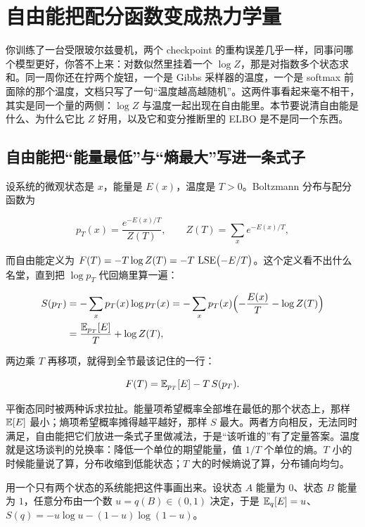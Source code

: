 \section{自由能把配分函数变成热力学量}
\label{sec:13-Machine-Learning/13-Statistical-Physics-and-Free-Energy/01}

你训练了一台受限玻尔兹曼机，两个 checkpoint 的重构误差几乎一样，同事问哪个模型更好，你答不上来：对数似然里挂着一个 \(\log Z\)，那是对指数多个状态求和。同一周你还在拧两个旋钮，一个是 Gibbs 采样器的温度，一个是 softmax 前面除的那个温度，文档只写了一句``温度越高越随机''。这两件事看起来毫不相干，其实是同一个量的两侧：\(\log Z\) 与温度一起出现在自由能里。本节要说清自由能是什么、为什么它比 \(Z\) 好用，以及它和变分推断里的 ELBO 是不是同一个东西。

\subsection{自由能把``能量最低''与``熵最大''写进一条式子}

设系统的微观状态是 \(x\)，能量是 \(E(x)\)，温度是 \(T>0\)。Boltzmann 分布与配分函数为

\[
p_T(x)=\frac{e^{-E(x)/T}}{Z(T)},
\qquad
Z(T)=\sum_x e^{-E(x)/T},
\]

而自由能定义为 \(F(T)=-T\log Z(T)=-T\,\operatorname{LSE}\bigl(-E/T\bigr)\)。这个定义看不出什么名堂，直到把 \(\log p_T\) 代回熵里算一遍：

\[
\begin{aligned}
S(p_T)&=-\sum_x p_T(x)\log p_T(x)
=-\sum_x p_T(x)\Bigl(-\frac{E(x)}{T}-\log Z(T)\Bigr)\\
&=\frac{\mathbb{E}_{p_T}[E]}{T}+\log Z(T),
\end{aligned}
\]

两边乘 \(T\) 再移项，就得到全节最该记住的一行：

\[
F(T)=\mathbb{E}_{p_T}[E]-T\,S(p_T).
\]

平衡态同时被两种诉求拉扯。能量项希望概率全部堆在最低的那个状态上，那样 \(\mathbb{E}[E]\) 最小；熵项希望概率摊得越平越好，那样 \(S\) 最大。两者方向相反，无法同时满足，自由能把它们放进一条式子里做减法，于是``该听谁的''有了定量答案。温度就是这场谈判的兑换率：降低一个单位的期望能量，值 \(1/T\) 个单位的熵。\(T\) 小的时候能量说了算，分布收缩到低能状态；\(T\) 大的时候熵说了算，分布铺向均匀。

用一个只有两个状态的系统能把这件事画出来。设状态 \(A\) 能量为 \(0\)、状态 \(B\) 能量为 \(1\)，任意分布由一个数 \(u=q(B)\in(0,1)\) 决定，于是 \(\mathbb{E}_q[E]=u\)、\(S(q)=-u\log u-(1-u)\log(1-u)\)。

